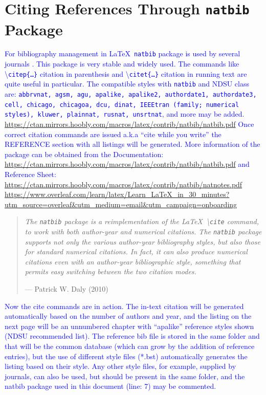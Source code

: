 \documentclass[phd,showgrids]{ndsu-thesis-2022}
\newcommand\italk[1]{\textcolor{blue}{#1}}  %
\newcommand\cmd[1]{\textbackslash\texttt{#1}}  %
\begin{document}

\section{Citing References Through \texttt{natbib} Package}
\italk{For bibliography management in \LaTeX\ \texttt{natbib} package is used by several journals \citep{daly2010natural}. This package is very stable and widely used. The commands like \cmd{citep\{\ldots\}} citation in parenthesis and \cmd{citet\{\ldots\}} citation in running text are quite useful in particular. The compatible styles with \texttt{natbib} and NDSU class are:  \texttt{abbrvnat, agsm, agu, apalike, apalike2, authordate1, authordate3, cell, chicago, chicagoa, dcu, dinat, IEEEtran (family;  numerical styles), kluwer, plainnat, rusnat, unsrtnat}, and more may be added. \url{https://ctan.mirrors.hoobly.com/macros/latex/contrib/natbib/natbib.pdf} Once correct citation commands are issued a.k.a ``cite while you write'' the REFERENCE section with all listings will be generated. More information of the package can be obtained from the Documentation: \textcolor{magenta}{\url{https://ctan.mirrors.hoobly.com/macros/latex/contrib/natbib/natbib.pdf}} and Reference Sheet: \!\!\textcolor{magenta}{\url{https://ctan.mirrors.hoobly.com/macros/latex/contrib/natbib/natnotes.pdf}}
\textcolor{magenta}{\url{https://www.overleaf.com/learn/latex/Learn_LaTeX_in_30_minutes?utm_source=overleaf&utm_medium=email&utm_campaign=onboarding}}}



\begin{quote}
\singlespacing
\raggedleft
\textit{The \texttt{natbib} package is a reimplementation of the \LaTeX\ \cmd{cite} command, to work with both author-year and numerical citations. The \texttt{natbib} package supports not only the various author-year bibliography styles, but also those for standard numerical citations. In fact, it can also produce numerical citations even with an author-year bibliographic style, something that permits easy switching between the two citation modes.} 

\hfill --- Patrick W. Daly (2010)
\end{quote}

\italk{Now the cite commands are in action. The in-text citation will be generated automatically based on the number of authors and year, and the listing on the next page will be an unnumbered chapter with ``apalike'' reference styles shown (NDSU recommended list). The reference bib file is stored in the same folder and that will be the common database (which can grow by the addition of reference entries), but the use of different style files (*.bst) automatically generates the listing based on their style. Any other style files, for example, supplied by journals, can also be used, but should be present in the same folder, and the natbib package used in this document (line: 7) may be commented.}
\end{document}
